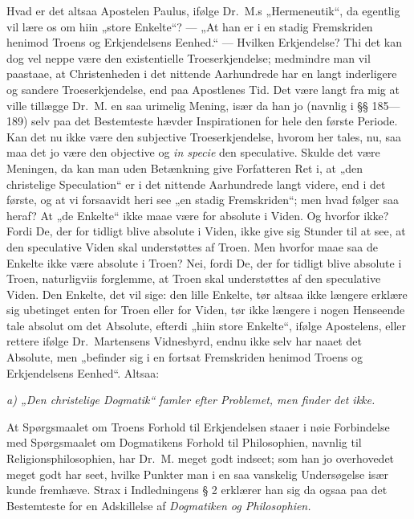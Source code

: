 Hvad er det altsaa Apostelen Paulus, ifølge Dr.\ M.s
„Hermeneutik“, da egentlig vil lære os om hiin „store Enkelte“?
--- „At han er i en stadig Fremskriden henimod Troens og
Erkjendelsens Eenhed.“ --- Hvilken Erkjendelse? Thi det kan dog
vel neppe være den existentielle Troeserkjendelse; medmindre man
vil paastaae, at Christenheden i det nittende Aarhundrede har en
langt inderligere og sandere Troeserkjendelse, end paa Apostlenes
Tid. Det være langt fra mig at ville tillægge Dr.\ M. en saa
urimelig Mening, især da han jo (navnlig i §§ 185---189) selv paa
det Bestemteste hævder Inspirationen for hele den første Periode.
Kan det nu ikke være den subjective Troeserkjendelse, hvorom her
tales, nu, saa maa det jo være den objective og \textit{in specie}
den speculative. Skulde det være Meningen, da kan man uden
Betænkning give Forfatteren Ret i, at „den christelige
Speculation“ er i det nittende Aarhundrede langt videre, end i det
første, og at vi forsaavidt heri see „en stadig Fremskriden“; men
hvad følger saa heraf?
 At „de Enkelte“ ikke maae være for absolute i Viden. Og hvorfor
ikke? Fordi De, der for tidligt blive absolute i Viden, ikke give
sig Stunder til at see, at den speculative Viden skal
understøttes af Troen. Men hvorfor maae saa de Enkelte ikke være
absolute i Troen? Nei, fordi De, der for tidligt blive absolute i
Troen, naturligviis forglemme, at Troen skal understøttes af den
speculative Viden. Den Enkelte, det vil sige: den lille Enkelte,
tør altsaa ikke længere erklære sig ubetinget enten for Troen
eller for Viden, tør ikke længere i nogen Henseende tale absolut
om det Absolute, efterdi „hiin store Enkelte“, ifølge Apostelens,
eller rettere ifølge Dr.\ Martensens Vidnesbyrd, endnu ikke selv
har naaet det Absolute, men „befinder sig i en fortsat
Fremskriden henimod Troens og Erkjendelsens Eenhed“. Altsaa:

\begin{center}
\emph{a) „Den christelige Dogmatik“ famler efter Problemet, men
finder det ikke.}
\end{center}

At Spørgsmaalet om Troens Forhold til Erkjendelsen staaer i nøie
Forbindelse med Spørgsmaalet om Dogmatikens Forhold til
Philosophien, navnlig til Religionsphilosophien, har Dr.\ M. meget
godt indseet; som han jo overhovedet meget godt har seet, hvilke
Punkter man i en saa vanskelig Undersøgelse især kunde fremhæve.
Strax i Indledningens § 2 erklærer han sig da ogsaa paa det
Bestemteste for en Adskillelse af \emph{Dogmatiken og
Philosophien.}

